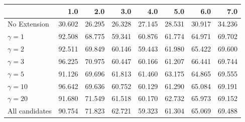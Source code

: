 \begin{tabular}{lrrrrrrr}
\toprule
{} &    1.0 &    2.0 &    3.0 &    4.0 &    5.0 &    6.0 &    7.0 \\
\midrule
No Extension   & 30.602 & 26.295 & 26.328 & 27.145 & 28.531 & 30.917 & 34.236 \\
$\gamma = 1$   & 92.508 & 68.775 & 59.341 & 60.876 & 61.774 & 64.971 & 69.702 \\
$\gamma = 2$   & 92.511 & 69.849 & 60.146 & 59.443 & 61.980 & 65.422 & 69.600 \\
$\gamma = 3$   & 96.225 & 70.975 & 60.447 & 60.166 & 61.207 & 66.441 & 69.744 \\
$\gamma = 5$   & 91.126 & 69.696 & 61.813 & 61.460 & 63.175 & 64.865 & 69.555 \\
$\gamma = 10$  & 96.642 & 69.636 & 60.752 & 60.129 & 61.290 & 65.084 & 69.191 \\
$\gamma = 20$  & 91.680 & 71.549 & 61.518 & 60.170 & 62.732 & 65.973 & 69.152 \\
All candidates & 90.754 & 71.823 & 62.721 & 59.323 & 61.304 & 65.069 & 69.488 \\
\bottomrule
\end{tabular}
